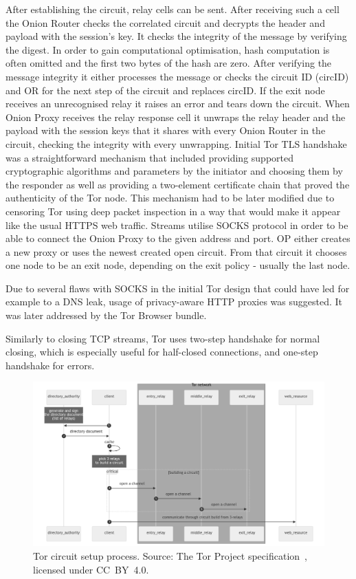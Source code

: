 After establishing the circuit, relay cells can be sent. After receiving such a cell the Onion Router checks the correlated circuit and decrypts the header and payload with the session’s key. It checks the integrity of the message by verifying the digest. In order to gain computational optimisation, hash computation is often omitted and the first two bytes of the hash are zero. After verifying the message integrity it either processes the message or checks the circuit ID (circID) and OR for the next step of the circuit and replaces circID. If the exit node receives an unrecognised relay it raises an error and tears down the circuit. When Onion Proxy receives the relay response cell it unwraps the relay header and the payload with the session keys that it shares with every Onion Router in the circuit, checking the integrity with every unwrapping. 
Initial Tor TLS handshake was a straightforward mechanism that included providing supported cryptographic algorithms and parameters by the initiator and choosing them by the responder as well as providing a two-element certificate chain that proved the authenticity of the Tor node. This mechanism had to be later modified due to censoring Tor using deep packet inspection in a way that would make it appear like the usual HTTPS web traffic.
Streams utilise SOCKS protocol in order to be able to connect the Onion Proxy to the given address and port. OP either creates a new proxy or uses the newest created open circuit. From that circuit it chooses one node to be an exit node, depending on the exit policy - usually the last node.

Due to several flaws with SOCKS in the initial Tor design that could have led for example to a DNS leak, usage of privacy-aware HTTP proxies was suggested. It was later addressed by the Tor Browser bundle.

Similarly to closing TCP streams, Tor uses two-step handshake for normal closing, which is especially useful for half-closed connections, and one-step handshake for errors.

\begin{figure}[ht]
  \centering
  \includegraphics[width=0.8\linewidth]{Images/tor-circuit.png}
  \caption{Tor circuit setup process. Source: The Tor Project specification~\cite{torproject-specs}, licensed under CC BY 4.0.}
  \label{fig:tor_spec}
\end{figure}

